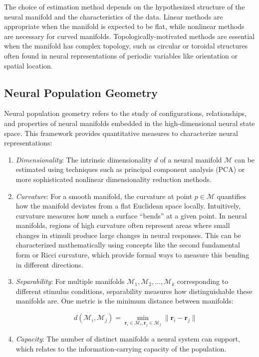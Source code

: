 \documentclass[11pt,a4paper]{article}
\begin{document}
\begin{enumerate}
    The choice of estimation method depends on the hypothesized structure of the neural manifold and the characteristics of the data. Linear methods are appropriate when the manifold is expected to be flat, while nonlinear methods are necessary for curved manifolds. Topologically-motivated methods are essential when the manifold has complex topology, such as circular or toroidal structures often found in neural representations of periodic variables like orientation or spatial location.
\end{enumerate}

\subsection{Neural Population Geometry}

Neural population geometry refers to the study of configurations, relationships, and properties of neural manifolds embedded in the high-dimensional neural state space. This framework provides quantitative measures to characterize neural representations:

\begin{enumerate}
    \item \textit{Dimensionality}: The intrinsic dimensionality $d$ of a neural manifold $\mathcal{M}$ can be estimated using techniques such as principal component analysis (PCA) or more sophisticated nonlinear dimensionality reduction methods.
    
    \item \textit{Curvature}: For a smooth manifold, the curvature at point $p \in \mathcal{M}$ quantifies how the manifold deviates from a flat Euclidean space locally. Intuitively, curvature measures how much a surface ``bends'' at a given point. In neural manifolds, regions of high curvature often represent areas where small changes in stimuli produce large changes in neural responses. This can be characterized mathematically using concepts like the second fundamental form or Ricci curvature, which provide formal ways to measure this bending in different directions.
    
    \item \textit{Separability}: For multiple manifolds $\mathcal{M}_1, \mathcal{M}_2, \ldots, \mathcal{M}_k$ corresponding to different stimulus conditions, separability measures how distinguishable these manifolds are. One metric is the minimum distance between manifolds:
    
    \begin{equation}
    d(\mathcal{M}_i, \mathcal{M}_j) = \min_{\mathbf{r}_i \in \mathcal{M}_i, \mathbf{r}_j \in \mathcal{M}_j} \|\mathbf{r}_i - \mathbf{r}_j\|
    \end{equation}
    
    \item \textit{Capacity}: The number of distinct manifolds a neural system can support, which relates to the information-carrying capacity of the population.
\end{enumerate}
\end{document}
